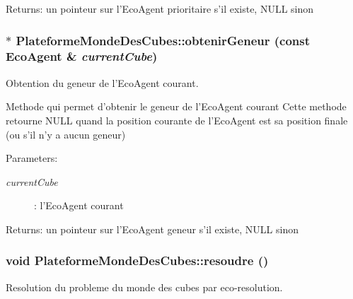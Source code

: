 \begin{Desc}
\item[Returns:]un pointeur sur l'EcoAgent prioritaire s'il existe, NULL sinon \end{Desc}
\hypertarget{classPlateformeMondeDesCubes_fd0d16680115dc57d5a43f433dde3592}{
\subsubsection[{obtenirGeneur}]{ $\ast$ PlateformeMondeDesCubes::obtenirGeneur (const {\bf EcoAgent} \& {\em currentCube})}}
\label{classPlateformeMondeDesCubes_fd0d16680115dc57d5a43f433dde3592}


Obtention du geneur de l'EcoAgent courant. 

Methode qui permet d'obtenir le geneur de l'EcoAgent courant Cette methode retourne NULL quand la position courante de l'EcoAgent est sa position finale (ou s'il n'y a aucun geneur)

\begin{Desc}
\item[Parameters:]
\begin{description}
\item[{\em currentCube}]: l'EcoAgent courant \end{description}
\end{Desc}
\begin{Desc}
\item[Returns:]un pointeur sur l'EcoAgent geneur s'il existe, NULL sinon \end{Desc}
\hypertarget{classPlateformeMondeDesCubes_c7be18c8d02e2743e884545828cfabed}{
\subsubsection[{resoudre}]{\setlength{\rightskip}{0pt plus 5cm}void PlateformeMondeDesCubes::resoudre ()}}
\label{classPlateformeMondeDesCubes_c7be18c8d02e2743e884545828cfabed}


Resolution du probleme du monde des cubes par eco-resolution. 

